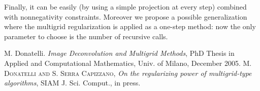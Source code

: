 \documentclass{report}
\begin{document}
Finally, it can be easily (by using a simple projection at every
step) combined with nonnegativity constraints. Moreover we propose
a possible generalization where the multigrid regularization is
applied as a one-step method: now the only parameter to choose is
the number of recursive calls.

\begin{thebibliography}{biblio}
{\sc M. Donatelli}. {\em Image Deconvolution and Multigrid Methods},
PhD Thesis in Applied and Computational Mathematics, Univ. of Milano, December 2005.
\textsc{M. Donatelli and S. Serra Capizzano},
\emph{On the regularizing power of multigrid-type algorithms},
SIAM J. Sci. Comput., in press.
\end{thebibliography}
\end{document}
